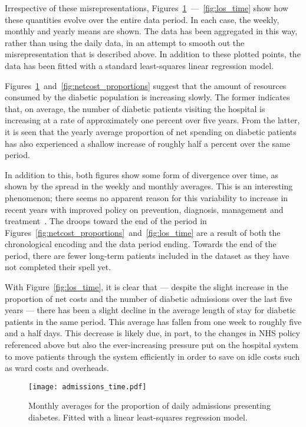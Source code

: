 Irrespective of these misrepresentations,
Figures~\ref{fig:admissions}~---~\ref{fig:los_time} show how these quantities
evolve over the entire data period. In each case, the weekly, monthly and yearly
means are shown. The data has been aggregated in this way, rather than using the
daily data, in an attempt to smooth out the misrepresentation that is described
above. In addition to these plotted points, the data has been fitted with a
standard least-squares linear regression model.

Figures~\ref{fig:admissions}~and~\ref{fig:netcost_proportions} suggest that the
amount of resources consumed by the diabetic population is increasing slowly.
The former indicates that, on average, the number of diabetic patients visiting
the hospital is increasing at a rate of approximately one percent over five
years. From the latter, it is seen that the yearly average proportion of net
spending on diabetic patients has also experienced a shallow increase of roughly
half a percent over the same period.

In addition to this, both figures show some form of divergence over time, as
shown by the spread in the weekly and monthly averages. This is an interesting
phenomenon; there seems no apparent reason for this variability to increase in
recent years with improved policy on prevention, diagnosis, management and
treatment~\cite{NHS:ltp,NICE,Penn2018,PHE}. The droops toward the end of the
period in Figures~\ref{fig:netcost_proportions}~and~\ref{fig:los_time} are a
result of both the chronological encoding and the data period ending. Towards
the end of the period, there are fewer long-term patients included in the
dataset as they have not completed their spell yet.

With Figure~\ref{fig:los_time}, it is clear that --- despite the slight increase
in the proportion of net costs and the number of diabetic admissions over the
last five years --- there has been a slight decline in the average length of
stay for diabetic patients in the same period. This average has fallen from one
week to roughly five and a half days. This decrease is likely due, in part, to
the changes in NHS policy referenced above but also the ever-increasing pressure
put on the hospital system to move patients through the system efficiently in
order to save on idle costs such as ward costs and overheads.

\begin{figure}
    \centering
    \texttt{[image: admissions\_time.pdf]}
    \caption{Monthly averages for the proportion of daily admissions presenting
        diabetes. Fitted with a linear least-squares regression model.}%
    \label{fig:admissions}
\end{figure}

